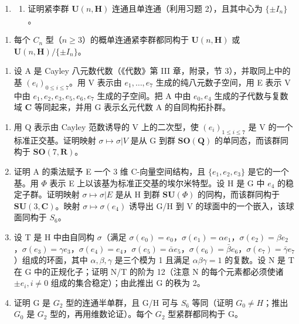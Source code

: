 \begin{enumerate}
\def\labelenumi{\arabic{enumi})}
\setcounter{enumi}{5}
\tightlist
\item
  \begin{enumerate}
  \def\labelenumii{\alph{enumii})}
  \tightlist
  \item
    证明紧李群 \(\mathbf{U}(n,\mathbf{H})\) 连通且单连通（利用习题 2），且其中心为 \(\{\pm I_{n}\}\)。
  \end{enumerate}
\end{enumerate}

\begin{enumerate}
\def\labelenumi{\alph{enumi})}
\setcounter{enumi}{1}
\tightlist
\item
  每个 \(C_{n}\) 型（\(n \geq 3\)）的概单连通紧李群都同构于 \(\mathbf{U}(n, \mathbf{H})\) 或 \(\mathbf{U}(n, \mathbf{H}) / \{\pm I_{n}\}\)。
\end{enumerate}

\begin{enumerate}
\def\labelenumi{\arabic{enumi})}
\setcounter{enumi}{6}
\tightlist
\item
  设 A 是 Cayley 八元数代数（《代数》第 III 章，附录，节 3），并取同上中的基 \((e_i)_{0\leq i\leq 7}\)。用 V 表示由 \(e_1,\ldots ,e_7\) 生成的纯八元数子空间，用 E 表示 V 中由 \(e_1,e_2,e_3,e_5,e_6,e_7\) 生成的子空间。把 A 中由 \(e_0,e_4\) 生成的子代数与复数域 \(\mathbf{C}\) 等同起来，并用 G 表示幺元代数 A 的自同构拓扑群。
\end{enumerate}

\begin{enumerate}
\def\labelenumi{\alph{enumi})}
\item
  用 Q 表示由 Cayley 范数诱导的 V 上的二次型，使 \((e_{i})_{1\leq i\leq7}\) 是 V 的一个标准正交基。证明映射 \(\sigma\mapsto\sigma|V\) 是从 G 到群 \(\mathbf{SO}(\mathbf{Q})\) 的单同态，而该群同构于 \(\mathbf{SO}(7,\mathbf{R})\)。
\item
  证明 A 的乘法赋予 E 一个 3 维 C-向量空间结构，且 \(\{e_{1}, e_{2}, e_{3}\}\) 是它的一个基。用 \(\Phi\) 表示 E 上以该基为标准正交基的埃尔米特型。设 H 是 G 中 \(e_{4}\) 的稳定子群。证明映射 \(\sigma \mapsto \sigma|E\) 是从 H 到群 \(\mathbf{SU}(\Phi)\) 的同构，而该群同构于 \(\mathbf{SU}(3, \mathbf{C})\)。映射 \(\sigma \mapsto \sigma(e_{4})\) 诱导出 G/H 到 V 的球面中的一个嵌入，该球面同构于 \(S_{6}\)。
\item
  设 T 是 H 中由自同构 \(\sigma\)（满足 \(\sigma(e_{0}) = e_{0}\)，\(\sigma(e_{1}) = \alpha e_{1}\)，\(\sigma(e_{2}) = \beta e_{2}\)，\(\sigma(e_{3}) = \gamma e_{3}\)，\(\sigma(e_{4}) = e_{4}\)，\(\sigma(e_{5}) = \bar{\alpha} e_{5}\)，\(\sigma(e_{6}) = \bar{\beta} e_{6}\)，\(\sigma(e_{7}) = \bar{\gamma} e_{7}\)）组成的环面，其中 \(\alpha, \beta, \gamma\) 是三个模为 1 且满足 \(\alpha\beta\gamma = 1\) 的复数。设 N 是 T 在 G 中的正规化子；证明 N/T 的阶为 12（注意 N 的每个元素都必须使诸 \(\pm e_{i}, i \neq 0\) 组成的集合稳定）；由此推出 G 的秩为 2。
\item
  证明 G 是 \(G_{2}\) 型的连通半单群，且 G/H 可与 \(S_{6}\) 等同（证明 \(G_{0} \neq H\)；推出 \(G_{0}\) 是 \(G_{2}\) 型的，再用维数论证）。每个 \(G_{2}\) 型紧群都同构于 G。
\end{enumerate}

